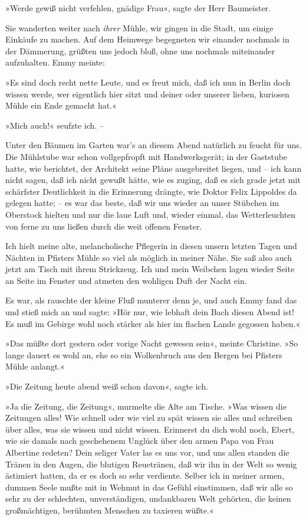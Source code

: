»Werde gewiß nicht verfehlen, gnädige Frau«, sagte der Herr
Baumeister.

Sie wanderten weiter nach \emph{ihrer} Mühle, wir gingen in die
Stadt, um einige Einkäufe zu machen. Auf dem Heimwege begegneten
wir einander nochmals in der Dämmerung, grüßten uns jedoch bloß,
ohne uns nochmals miteinander aufzuhalten. Emmy meinte:

»Es sind doch recht nette Leute, und es freut mich, daß ich nun in
Berlin doch wissen werde, wer eigentlich hier sitzt und deiner oder
unserer lieben, kuriosen Mühle ein Ende gemacht hat.«

»Mich auch!« seufzte ich. –

Unter den Bäumen im Garten war's an diesem Abend natürlich zu
feucht für uns. Die Mühlstube war schon vollgepfropft mit
Handwerksgerät; in der Gaststube hatte, wie berichtet, der
Architekt seine Pläne ausgebreitet liegen, und – ich kann nicht
sagen, daß ich nicht gewußt hätte, wie es zuging, daß es sich grade
jetzt mit schärfster Deutlichkeit in die Erinnerung drängte, wie
Doktor Felix Lippoldes da gelegen hatte; – es war das beste, daß
wir uns wieder an unser Stübchen im Oberstock hielten und nur die
laue Luft und, wieder einmal, das Wetterleuchten von ferne zu uns
ließen durch die weit offenen Fenster.

Ich hielt meine alte, melancholische Pflegerin in diesen unsern
letzten Tagen und Nächten in Pfisters Mühle so viel als möglich in
meiner Nähe. Sie saß also auch jetzt am Tisch mit ihrem Strickzeug.
Ich und mein Weibchen lagen wieder Seite an Seite im Fenster und
atmeten den wohligen Duft der Nacht ein.

Es war, als rauschte der kleine Fluß munterer denn je, und auch
Emmy fand das und stieß mich an und sagte: »Hör nur, wie lebhaft
dein Bach diesen Abend ist! Es muß im Gebirge wohl noch stärker als
hier im flachen Lande gegossen haben.«

»Das müßte dort gestern oder vorige Nacht gewesen sein«, meinte
Christine. »So lange dauert es wohl an, ehe so ein Wolkenbruch aus
den Bergen bei Pfisters Mühle anlangt.«

»Die Zeitung heute abend weiß schon davon«, sagte ich.

»Ja die Zeitung, die Zeitung«, murmelte die Alte am Tische. »Was
wissen die Zeitungen alles! Wie schnell oder wie viel zu spät
wissen sie alles und schreiben über alles, was sie wissen und nicht
wissen. Erinnerst du dich wohl noch, Ebert, wie sie damals nach
geschehenem Unglück über den armen Papa von Frau Albertine redeten?
Dein seliger Vater las es uns vor, und uns allen standen die Tränen
in den Augen, die blutigen Reuetränen, daß wir ihn in der Welt so
wenig ästimiert hatten, da er es doch so sehr verdiente. Selber ich
in meiner armen, dummen Seele mußte mit in Wehmut in das Gefühl
einstimmen, daß wir alle so sehr zu der schlechten, unverständigen,
undankbaren Welt gehörten, die keinen großmächtigen, berühmten
Menschen zu taxieren wüßte.«

